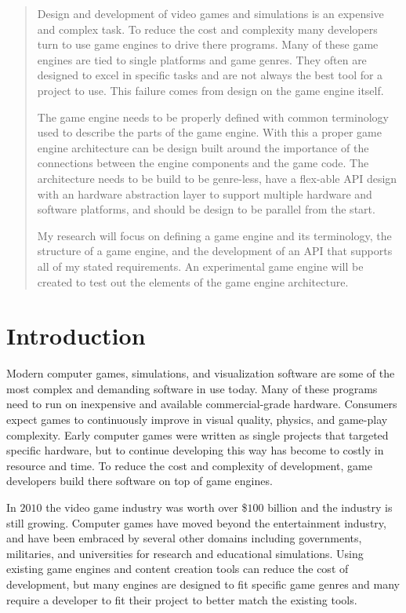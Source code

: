\documentclass[12pt,a4paper,oneside]{article}
\begin{document}
\begin{abstract}
Design and development of video games and simulations is an expensive and complex task.  To reduce the cost and complexity many developers turn to use game engines to drive there programs.  Many of these game engines are tied to single platforms and game genres.  They often are designed to excel in specific tasks and are not always the best tool for a project to use.  This failure comes from design on the game engine itself.

The game engine needs to be properly defined with common terminology used to describe the parts of the game engine.  With this a proper game engine architecture can be design built around the importance of the connections between the engine components and the game code.  The architecture needs to be build to be genre-less, have a flex-able API design with an hardware abstraction layer to support multiple hardware and software platforms, and should be design to be parallel from the start.   

My research will focus on defining a game engine and its terminology, the structure of a game engine, and the development of an API that supports all of my stated requirements.  An experimental game engine will be created to test out the elements of the game engine architecture. 

\end{abstract}
\newpage 
\tableofcontents
\newpage 

\section{ Introduction }
Modern computer games, simulations, and visualization software are some of the most complex and demanding software in use today.  Many of these programs need to run on inexpensive and available commercial-grade hardware.  Consumers expect games to continuously improve in visual quality, physics, and game-play complexity.  Early computer games were written as single projects that targeted specific hardware, but to continue developing this way has become to costly in resource and time.  To reduce the cost and complexity of development, game developers build there software on top of game engines.

In $2010$ the video game industry was worth over \$$100$ billion\citep{French:2010} and the industry is still growing.  Computer games have moved beyond the entertainment industry, and have been embraced by several other domains including governments, militaries, and universities for research and educational simulations.  Using existing game engines and content creation tools can reduce the cost of development, but many engines are designed to fit specific game genres and many require a developer to fit their project to better match the existing tools.  
\end{document}
